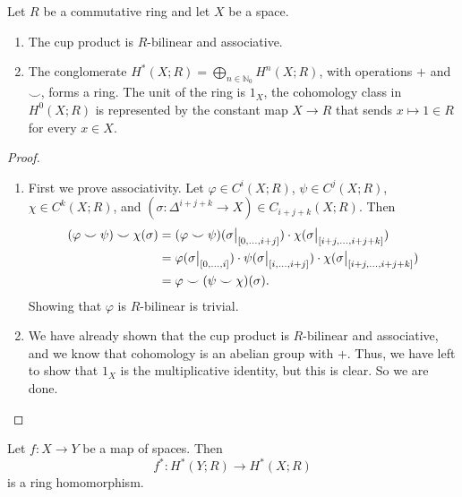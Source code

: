 \begin{proposition}
    Let $R$ be a commutative ring and let $X$ be a space.
    \begin{enumerate}
        \item The cup product is $R$-bilinear and associative.
        \item The conglomerate $H^*(X;R) = \bigoplus_{n \in \mathbb N_0} H^n(X;R)$, with operations ${+}$ and ${\smile}$, forms a ring. The unit of the ring is $1_X$, the cohomology class in $H^0(X;R)$ is represented by the constant map $X \to R$ that sends $x \mapsto 1 \in R$ for every $x \in X$.
    \end{enumerate}
\end{proposition}

\begin{proof}
    \begin{enumerate}
        \item First we prove associativity. Let $\varphi \in C^i(X; R)$, $\psi \in C^j(X; R)$, $\chi \in C^k(X; R)$, and $(\sigma: \Delta^{i + j + k} \to X) \in C_{i+j+k}(X; R)$. Then
              \begin{align*}
                  (\varphi \smile \psi) \smile \chi(\sigma)
                   & = (\varphi \smile \psi)(\restr{\sigma}{[0, \ldots, i+j]}) \cdot \chi(\restr{\sigma}{[i+j, \ldots, i+j+k]})                              \\
                   & = \varphi(\restr{\sigma}{[0, \ldots, i]}) \cdot \psi(\restr{\sigma}{[i, \ldots, i+j]}) \cdot \chi(\restr{\sigma}{[i+j, \ldots, i+j+k]}) \\
                   & = \varphi \smile (\psi \smile \chi)(\sigma).
              \end{align*}
              Showing that $\varphi$ is $R$-bilinear is trivial.
        \item We have already shown that the cup product is $R$-bilinear and associative, and we know that cohomology is an abelian group with $+$. Thus, we have left to show that $1_X$ is the multiplicative identity, but this is clear. So we are done.
    \end{enumerate}
\end{proof}

\begin{theorem}
    Let $f: X \to Y$ be a map of spaces. Then
    \[ f^*: H^*(Y; R) \to H^*(X; R) \]
    is a ring homomorphism.
\end{theorem}

